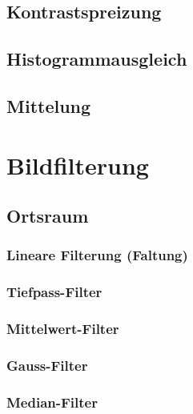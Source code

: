 \documentclass[a4paper, 11pt, accentcolor = tud3b]{tudreport}
\begin{document}
			\subsection{Kontrastspreizung} %

			\subsection{Histogrammausgleich} %

			\subsection{Mittelung} %

		\section{Bildfilterung} %

			\subsection{Ortsraum} %

				\subsubsection{Lineare Filterung (Faltung)} %

				\subsubsection{Tiefpass-Filter} %

				\subsubsection{Mittelwert-Filter} %

				\subsubsection{Gauss-Filter} %

				\subsubsection{Median-Filter} %
\end{document}
